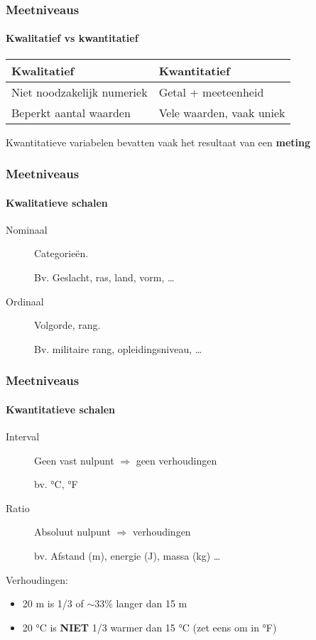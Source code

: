 \documentclass[aspectratio=169]{beamer}
\begin{document}
\begin{frame}
  \frametitle{Meetniveaus}
  \framesubtitle{Kwalitatief vs kwantitatief}
  
  \begin{center}
    \begin{tabular}{ll}
    	\textbf{Kwalitatief}       & \textbf{Kwantitatief}    \\
    	\hline
    	Niet noodzakelijk numeriek & Getal + meeteenheid      \\
    	Beperkt aantal waarden     & Vele waarden, vaak uniek
    \end{tabular}
  \end{center}

  \bigskip

  Kwantitatieve variabelen bevatten vaak het resultaat van een \textbf{meting}
\end{frame}

\begin{frame}
  \frametitle{Meetniveaus}
  \framesubtitle{Kwalitatieve schalen}
  
  \begin{description}
    \item[Nominaal] Categorieën.
    
      Bv. Geslacht, ras, land, vorm, \ldots
      
    \item[Ordinaal] Volgorde, rang.
    
      Bv. militaire rang, opleidingsniveau, \ldots
  \end{description}
  
\end{frame}

\begin{frame}
  \frametitle{Meetniveaus}
  \framesubtitle{Kwantitatieve schalen}
  
  \begin{description}
    \item[Interval] Geen vast nulpunt $\Rightarrow$ geen verhoudingen
    
    bv. °C, °F
    
    \item[Ratio] Absoluut nulpunt $\Rightarrow$ verhoudingen
    
    bv. Afstand (m), energie (J), massa (kg) \ldots\\
  \end{description}

  \bigskip

  Verhoudingen:
  
  \begin{itemize}
    \item 20 m is 1/3 of $\sim$33\% langer dan 15 m
    \item 20 °C is \textbf{NIET} 1/3 warmer dan 15 °C (zet eens om in °F)

  \end{itemize}    
  
\end{frame}
\end{document}
